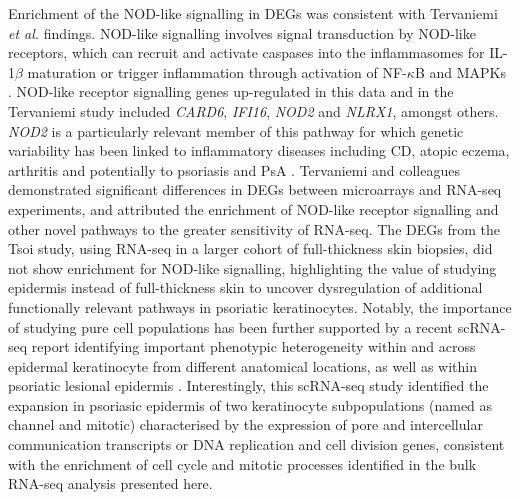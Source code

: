 Enrichment of the NOD-like signalling in DEGs was consistent with Tervaniemi \textit{et al.} findings. NOD-like signalling involves signal transduction by NOD-like receptors, which can recruit and activate caspases into the inflammasomes for IL-1$\beta$ maturation or trigger inflammation through activation of NF-$\kappa$B and MAPKs \parencite{McCormack2009}. NOD-like receptor signalling genes up-regulated in this data and in the Tervaniemi study included \textit{CARD6}, \textit{IFI16}, \textit{NOD2} and \textit{NLRX1}, amongst others. \textit{NOD2} is a particularly relevant member of this pathway for which genetic variability has been linked to inflammatory diseases including CD, atopic eczema, arthritis and potentially to psoriasis and PsA \parencite{Zhong2013,Zhu2012}. %
Tervaniemi and colleagues demonstrated significant differences in DEGs between microarrays and RNA-seq experiments, and attributed the enrichment of NOD-like receptor signalling and other novel pathways to the greater sensitivity of RNA-seq. The DEGs from the Tsoi study, using RNA-seq in a larger cohort of full-thickness skin biopsies, did not show enrichment for NOD-like signalling, highlighting the value of studying epidermis instead of full-thickness skin to uncover dysregulation of additional functionally relevant pathways in psoriatic keratinocytes. Notably, the importance of studying pure cell populations has been further supported by a recent scRNA-seq report identifying important phenotypic heterogeneity within and across epidermal keratinocyte from different anatomical locations, as well as within psoriatic lesional epidermis \parencite{Cheng2018}. Interestingly, this scRNA-seq study identified the expansion in psoriasic epidermis of two keratinocyte subpopulations (named as channel and mitotic) characterised by the expression of pore and intercellular communication transcripts or DNA replication and cell division genes, consistent with the enrichment of cell cycle and mitotic processes identified in the bulk RNA-seq analysis presented here.

